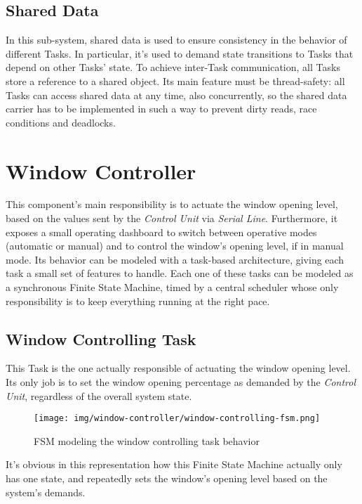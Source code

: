 \documentclass[a4paper,12pt]{report}
\begin{document}
		\subsection{Shared Data}
		In this sub-system, shared data is used to ensure consistency in the behavior of different Tasks. In particular, it's used to demand state transitions to Tasks that depend on other Tasks' state.
		\newline To achieve inter-Task communication, all Tasks store a reference to a shared object. Its main feature must be thread-safety: all Tasks can access shared data at any time, also concurrently, so the shared data carrier has to be implemented in such a way to prevent dirty reads, race conditions and deadlocks.
	\section{Window Controller}
	This component's main responsibility is to actuate the window opening level, based on the values sent by the \textit{Control Unit} via \textit{Serial Line}. Furthermore, it exposes a small operating dashboard to switch between operative modes (automatic or manual) and to control the window's opening level, if in manual mode. Its behavior can be modeled with a task-based architecture, giving each task a small set of features to handle. Each one of these tasks can be modeled as a synchronous Finite State Machine, timed by a central scheduler whose only responsibility is to keep everything running at the right pace.
		\subsection{Window Controlling Task}
		This Task is the one actually responsible of actuating the window opening level. Its only job is to set the window opening percentage as demanded by the \textit{Control Unit}, regardless of the overall system state.
		\begin{figure}[H]
			\centering{}
			\texttt{[image: img/window-controller/window-controlling-fsm.png]}
			\caption{FSM modeling the window controlling task behavior}
			\label{img:window-controller/window-controlling-fsm}
		\end{figure}
		It's obvious in this representation how this Finite State Machine actually only has one state, and repeatedly sets the window's opening level based on the system's demands.
\end{document}
